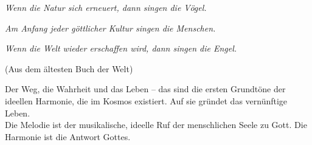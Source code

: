 \documentclass[11pt,a5paper,twoside]{article}
\begin{document}








 


\renewcommand{\cfttoctitlefont}{\bfseries \Large} %
\def\contentstitlefont{\bfseries\small}
\setlength{\cftbeforetoctitleskip}{0em} %
\renewcommand{\cftsecleader} {\cftdotfill{\cftdotsep}} %
\begin{center}
\tableofcontents
\end{center}

\thispagestyle{empty}
%
%


\setcounter{page}{7}



\newpage
\begin{titlepage}
	
\vspace*{8.5cm}
	
\textit{Wenn die Natur sich erneuert, dann singen die Vögel.}

\textit{Am Anfang jeder göttlicher Kultur singen die Menschen.}

\textit{Wenn die Welt wieder erschaffen wird, dann singen die Engel.}


\begin{flushright}
	(Aus dem ältesten Buch der Welt)
\end{flushright}

\vspace*{1.0cm}

Der Weg, die Wahrheit und das Leben -- das sind die ersten Grundtöne der ideellen Harmonie, die im Kosmos existiert. Auf sie gründet das vernünftige Leben.\\

Die Melodie ist der musikalische, ideelle Ruf der menschlichen Seele zu Gott. Die Harmonie ist die Antwort Gottes. 






\end{titlepage}
\end{document}
